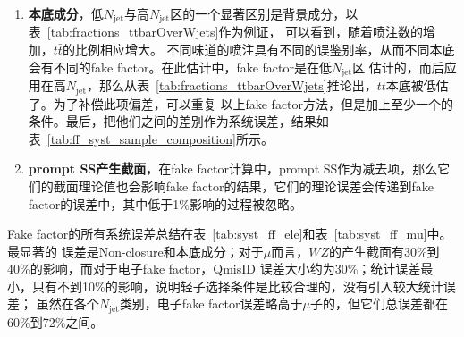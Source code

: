 \begin{enumerate}
  \item \textbf{本底成分}，低$N_{\text{jet}}$与高$N_{\text{jet}}$区的一个显著区别是背景成分，以表~\ref{tab:fractions_ttbarOverWjets}作为例证，
可以看到，随着喷注数的增加，$t\bar{t}$的比例相应增大。
不同味道的喷注具有不同的误鉴别率，从而不同本底会有不同的fake factor。在此估计中，fake factor是在低$N_{\text{jet}}$区
估计的，而后应用在高$N_{\text{jet}}$，那么从表~\ref{tab:fractions_ttbarOverWjets}推论出，$t\bar{t}$本底被低估了。为了补偿此项偏差，可以重复
以上fake factor方法，但是加上至少一个\bjet 的条件。最后，把他们之间的差别作为系统误差，结果如表~\ref{tab:ff_syst_sample_composition}所示。



  \item \textbf{prompt SS产生截面}，在fake factor计算中，prompt SS作为减去项，那么它们的截面理论值也会影响fake
factor的结果，它们的理论误差会传递到fake factor的误差中，其中低于1\%影响的过程被忽略。
\end{enumerate}
 
 Fake factor的所有系统误差总结在表~\ref{tab:syst_ff_ele}和表~\ref{tab:syst_ff_mu}中。最显著的
误差是Non-closure和本底成分；对于$\mu$而言，$WZ$的产生截面有30\%到40\%的影响，而对于电子fake factor，QmisID
误差大小约为30\%；统计误差最小，只有不到10\%的影响，说明轻子选择条件是比较合理的，没有引入较大统计误差；
虽然在各个$N_{\text{jet}}$类别，电子fake factor误差略高于$\mu$子的，但它们总误差都在60\%到72\%之间。


